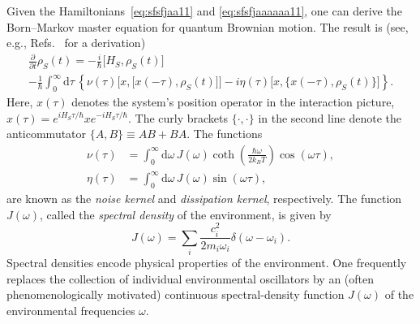 \documentclass[3p,sort&compress,12pt]{elsarticle}
\newcommand{\D}{\ensuremath{\mathrm{d}}}
\newcommand{\E}{\ensuremath{e}}
\newcommand{\I}{\ensuremath{i}}
\newcommand{\op}[1]{#1}
\begin{document}
Given the Hamiltonians~\eqref{eq:sfsfjaa11} and \eqref{eq:sfsfjaaaaaa11}, one can derive the Born--Markov master equation for quantum Brownian motion. The result is (see, e.g., Refs.~\cite{Breuer:2002:oq,Schlosshauer:2007:un} for a derivation)
%
\begin{multline}
\label{eq:vjp32q22}
  \frac{\partial}{\partial t} \op{\rho}_S(t) 
  = -\frac{\I}{\hbar} \bigl[ \op{H}_S, \op{\rho}_S(t) \bigr]  \\ -
  \frac{1}{\hbar} \int_0^\infty \D \tau \, \left\{ \nu(\tau) \bigl[ x, \bigl[
      x(-\tau), \op{\rho}_S(t) \bigr]\bigr] - \I \eta(\tau) \bigl[ x,
    \bigl\{ x(-\tau), \op{\rho}_S(t)
    \bigr\}\bigr] \right\}.
\end{multline}
%
Here, $x(\tau)$ denotes the system's position operator in the interaction picture, $x(\tau) = \E^{\I \op{H}_S\tau/\hbar} x\E^{-\I \op{H}_S\tau/\hbar}$. The curly brackets $\{\cdot , \cdot \}$ in the second line denote the anticommutator $\{ A, B \} \equiv AB + BA$. The functions
%
\begin{align}
  \nu(\tau) &= \int_0^\infty \D \omega
  \, J(\omega) \coth
  \left(\frac{\hbar\omega}{2k_B T}\right) \cos \left(\omega\tau\right), \label{eq:vdjpoo17} \\
  \eta(\tau) &= \int_0^\infty \D \omega\, J(\omega)
  \sin\left(\omega\tau\right), \label{eq:ponol218}
\end{align}
%
are known as the \emph{noise kernel} and \emph{dissipation kernel}, respectively. The function $J(\omega)$, called the \emph{spectral density} of the environment, is given by 
%
\begin{equation}
\label{eq:vdfpmdmv16}
  J(\omega) = \sum_i  \frac{c_i^2}{2m_i\omega_i} \delta(\omega-\omega_i).
\end{equation}
%
Spectral densities encode physical properties of the environment. One frequently replaces the collection of individual environmental oscillators by an (often phenomenologically motivated) continuous spectral-density function $J(\omega)$ of the environmental frequencies $\omega$. 
\end{document}
